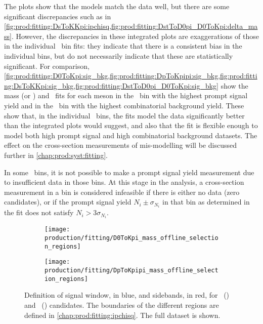 The plots show that the models match the data well, but there are some 
significant discrepancies such as in 
\cref{fig:prod:fitting:DsToKKpi:ipchisq,fig:prod:fitting:DstToD0pi_D0ToKpi:delta_mass}.
However, the discrepancies in these integrated plots are exaggerations of those 
in the individual \pTy\ bin fits: they indicate that there is a consistent bias 
in the individual bins, but do not necessarily indicate that these are 
statistically significant.
For comparison, 
\cref{fig:prod:fitting:D0ToKpi:sig_bkg,fig:prod:fitting:DpToKpipi:sig_bkg,fig:prod:fitting:DsToKKpi:sig_bkg,fig:prod:fitting:DstToD0pi_D0ToKpi:sig_bkg} 
show the mass (or \deltam) and \lnipchisq\ fits for each meson in the \pTy\ bin 
with the highest prompt signal yield and in the \pTy\ bin with the highest 
combinatorial background yield.
These show that, in the individual \pTy\ bins, the fits model the data 
significantly better than the integrated plots would suggest, and also that the 
fit is flexible enough to model both high prompt signal and high combinatorial 
background datasets.
The effect on the cross-section measurements of mis-modelling will be discussed 
further in \cref{chap:prod:syst:fitting}.

In some \pTy\ bins, it is not possible to make a prompt signal yield 
measurement due to insufficient data in those bins.
At this stage in the analysis, a cross-section measurement in a bin is 
considered infeasible if there is either no data (zero candidates), or if the 
prompt signal yield $N_{i} \pm \sigma_{N_{i}}$ in that bin as determined in the 
fit does not satisfy $N_{i} > 3\sigma_{N_{i}}$.

\begin{figure}
  \begin{subfigure}{0.5\textwidth}
    \texttt{[image: production/fitting/D0ToKpi\_mass\_offline\_selection\_regions]}
    \caption{\DzToKpi}
    \label{fig:prod:fitting:regions:D0ToKpi}
  \end{subfigure}
  \begin{subfigure}{0.5\textwidth}
    \texttt{[image: production/fitting/DpToKpipi\_mass\_offline\_selection\_regions]}
    \caption{\DpToKpipi}
    \label{fig:prod:fitting:regions:DpToKpipi}
  \end{subfigure}
  \caption{%
    Definition of signal window, in blue, and sidebands, in red, for 
    \DzToKpi~() and 
    \DpToKpipi~() candidates.
    The boundaries of the different regions are defined in 
    \cref{chap:prod:fitting:ipchisq}.
    The full dataset is shown.
  }
  \label{fig:prod:fitting:regions_A}
\end{figure}


